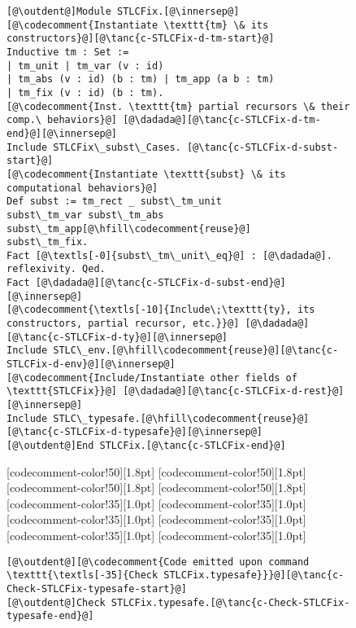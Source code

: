 \begin{figure}
\begin{minipage}{\textwidth}
\begin{multicols}{2}
\begin{lstlisting}
[@\outdent@]Module STLCFix.[@\innersep@]
[@\codecomment{Instantiate \texttt{tm} \& its constructors}@][@\tanc{c-STLCFix-d-tm-start}@]
Inductive tm : Set :=
| tm_unit | tm_var (v : id)
| tm_abs (v : id) (b : tm) | tm_app (a b : tm)
| tm_fix (v : id) (b : tm).
[@\codecomment{Inst. \texttt{tm} partial recursors \& their comp.\ behaviors}@] [@\dadada@][@\tanc{c-STLCFix-d-tm-end}@][@\innersep@]
Include STLCFix\_subst\_Cases. [@\tanc{c-STLCFix-d-subst-start}@]
[@\codecomment{Instantiate \texttt{subst} \& its computational behaviors}@]
Def subst := tm_rect _ subst\_tm_unit
subst\_tm_var subst\_tm_abs subst\_tm_app[@\hfill\codecomment{reuse}@]
subst\_tm_fix.
Fact [@\textls[-0]{subst\_tm\_unit\_eq}@] : [@\dadada@]. reflexivity. Qed.
Fact [@\dadada@][@\tanc{c-STLCFix-d-subst-end}@][@\innersep@]
[@\codecomment{\textls[-10]{Include\;\texttt{ty}, its constructors, partial recursor, etc.}}@] [@\dadada@][@\tanc{c-STLCFix-d-ty}@][@\innersep@]
Include STLC\_env.[@\hfill\codecomment{reuse}@][@\tanc{c-STLCFix-d-env}@][@\innersep@]
[@\codecomment{Include/Instantiate other fields of \texttt{STLCFix}}@] [@\dadada@][@\tanc{c-STLCFix-d-rest}@][@\innersep@]
Include STLC\_typesafe.[@\hfill\codecomment{reuse}@][@\tanc{c-STLCFix-d-typesafe}@][@\innersep@]
[@\outdent@]End STLCFix.[@\tanc{c-STLCFix-end}@]
\end{lstlisting}

[codecomment-color!50][1.8pt]
[codecomment-color!50][1.8pt]
[codecomment-color!50][1.8pt]
[codecomment-color!50][1.8pt]
[codecomment-color!35][1.0pt]
[codecomment-color!35][1.0pt]
[codecomment-color!35][1.0pt]
[codecomment-color!35][1.0pt]
[codecomment-color!35][1.0pt]
[codecomment-color!35][1.0pt]

\vspace{-3pt}


\begin{lstlisting}
[@\outdent@][@\codecomment{Code emitted upon command \texttt{\textls[-35]{Check STLCFix.typesafe}}}@][@\tanc{c-Check-STLCFix-typesafe-start}@]
[@\outdent@]Check STLCFix.typesafe.[@\tanc{c-Check-STLCFix-typesafe-end}@]
\end{lstlisting}


\end{multicols}
\end{minipage}
\end{figure}
